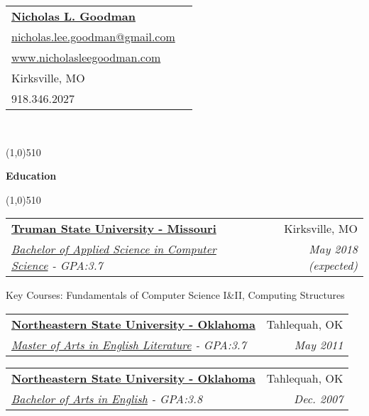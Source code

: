 \documentclass[letterpaper,11pt]{article}
\makeatletter
\newcommand{\resitem}[1]{\item #1 \vspace{-2pt}}
\newcommand{\resheading}[1]{{\large {\begin{minipage}{\textwidth}{\textbf{#1 \vphantom{p\^{E}}}}\end{minipage}}}}
\newcommand{\ressubheading}[4]{
\begin{tabular*}{6.5in}{l@{\extracolsep{\fill}}r}
		\textbf{#1} & #2 \\
		\textit{#3} & \textit{#4} \\
\end{tabular*}\vspace{-6pt}}
\makeatother
\begin{document}
\newcommand{\mywebheader}{
\begin{tabular*}{7in}{l@{\extracolsep{\fill}}r}
	\textbf{\href{http://www.nicholasleegoodman.com/}{\LARGE Nicholas L. Goodman}}\\
	\href{mailto:nicholas.lee.goodman@gmail.com}{nicholas.lee.goodman@gmail.com}\\
	\href{http://www.nicholasleegoodman.com}{www.nicholasleegoodman.com} \\ 	
	{Kirksville, MO} \\
	{918.346.2027}
	\end{tabular*}
\\
\renewcommand{\labelitemi}{$-$}

\vspace{0.1in}}

\mywebheader


\line(1,0){510}

\resheading {Education}

\line(1,0){510}

	\begin{description}

		\item
			\ressubheading {\href{http://www.truman.edu}{Truman State University - Missouri}}{Kirksville, MO}{\href{http://www.truman.edu/majors-programs/majors-minors/computer-science-major/}{Bachelor of Applied Science in Computer Science} - {GPA:3.7}}{ \footnotesize{May 2018 (expected)}}
				{ \footnotesize
				\begin{description}				
					\resitem{Key Courses: Fundamentals of Computer Science I\&II, Computing Structures}
				\end{description}
				}
		\item	
			\ressubheading{\href{http://www.nsuok.edu}{Northeastern State University - Oklahoma}}{Tahlequah, OK}{\href{https://www.nsuok.edu/Academics/DegreesMajors/GraduateMasters.aspx}{Master of Arts in English Literature} - {GPA:3.7}}{ \footnotesize{May 2011}}
		\item	
			\ressubheading{\href{http://www.nsuok.edu}{Northeastern State University - Oklahoma}}{Tahlequah, OK}{\href{https://www.nsuok.edu/Academics/DegreesMajors/Tahlequah.aspx}{Bachelor of Arts in English} - {GPA:3.8}}{ \footnotesize{Dec. 2007}}
		\end{description} %

\end{document}

